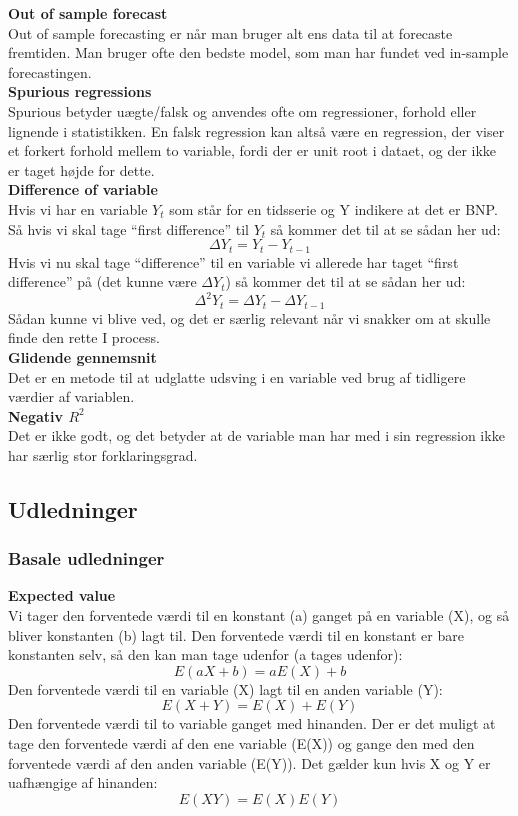 \documentclass[
  10pt,
]{article}
\begin{document}
\textbf{Out of sample forecast}\\
Out of sample forecasting er når man bruger alt ens data til at
forecaste fremtiden. Man bruger ofte den bedste model, som man har
fundet ved in-sample forecastingen.\\

\textbf{Spurious regressions}\\
Spurious betyder uægte/falsk og anvendes ofte om regressioner, forhold
eller lignende i statistikken. En falsk regression kan altså være en
regression, der viser et forkert forhold mellem to variable, fordi der
er unit root i dataet, og der ikke er taget højde for dette.\\

\textbf{Difference of variable}\\
Hvis vi har en variable \(Y_t\) som står for en tidsserie og Y indikere
at det er BNP. Så hvis vi skal tage ``first difference'' til \(Y_t\) så
kommer det til at se sådan her ud: \[\Delta Y_t = Y_t - Y_{t-1}  \] Hvis
vi nu skal tage ``difference'' til en variable vi allerede har taget
``first difference'' på (det kunne være \(\Delta Y_t\)) så kommer det
til at se sådan her ud: \[\Delta^2 Y_t =\Delta Y_t - \Delta Y_{t-1}  \]
Sådan kunne vi blive ved, og det er særlig relevant når vi snakker om at
skulle finde den rette I process.\\

\textbf{Glidende gennemsnit}\\
Det er en metode til at udglatte udsving i en variable ved brug af
tidligere værdier af variablen.\\

\textbf{Negativ $R^2$}\\
Det er ikke godt, og det betyder at de variable man har med i sin
regression ikke har særlig stor forklaringsgrad.\\

\hypertarget{udledninger}{%
\subsection{Udledninger}\label{udledninger}}

\hypertarget{basale-udledninger}{%
\subsubsection{Basale udledninger}\label{basale-udledninger}}

\textbf{Expected value}\\
Vi tager den forventede værdi til en konstant (a) ganget på en variable
(X), og så bliver konstanten (b) lagt til. Den forventede værdi til en
konstant er bare konstanten selv, så den kan man tage udenfor (a tages
udenfor):\\
\[E(aX+b) = aE(X) + b \] Den forventede værdi til en variable (X) lagt
til en anden variable (Y):\\
\[E(X + Y) = E(X) + E(Y) \] Den forventede værdi til to variable ganget
med hinanden. Der er det muligt at tage den forventede værdi af den ene
variable (E(X)) og gange den med den forventede værdi af den anden
variable (E(Y)). Det gælder kun hvis X og Y er uafhængige af hinanden:\\
\[E(XY) = E(X)E(Y) \]
\end{document}
